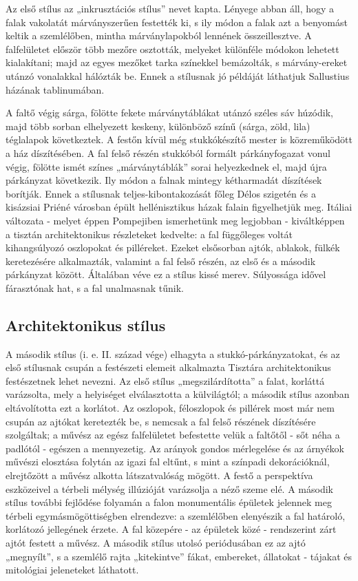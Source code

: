 	Az első stílus az „inkrusztációs stílus” nevet kapta. Lényege abban áll, hogy a falak
	vakolatát márványszerűen festették ki, s ily módon a falak azt a benyomást keltik a
	szemlélőben, mintha márványlapokból lennének összeillesztve. A falfelületet először
	több mezőre osztották, melyeket különféle módokon lehetett kialakítani; majd az egyes
	mezőket tarka színekkel bemázolták, s márvány-ereket utánzó vonalakkal hálózták be.
	Ennek a stílusnak jó példáját láthatjuk Sallustius házának tablinumában.
	
	
	A faltő végig sárga, fölötte fekete márványtáblákat utánzó széles sáv húzódik, majd több
	sorban elhelyezett keskeny, különböző színű (sárga, zöld, lila) téglalapok következtek. A
	festőn kívül még stukkókészítő mester is közreműködött a ház díszítésében. A fal felső
	részén stukkóból formált párkányfogazat vonul végig, fölötte ismét színes „márványtáblák” sorai helyezkednek el, majd újra párkányzat következik. Ily módon a
	falnak mintegy kétharmadát díszítések borítják.
	Ennek a stílusnak teljes-kibontakozását főleg Délos szigetén és a kisázsiai Priéné
	városban épült hellénisztikus házak falain figyelhetjük meg. Itáliai változata - melyet
	éppen Pompejiben ismerhetünk meg legjobban - kiváltképpen a tisztán architektonikus
	részleteket kedvelte: a fal függőleges voltát kihangsúlyozó oszlopokat és pilléreket.
	Ezeket elsősorban ajtók, ablakok, fülkék keretezésére alkalmazták, valamint a fal felső
	részén, az első és a második párkányzat között. Általában véve ez a stílus kissé merev.
	Súlyossága idővel fárasztónak hat, s a fal unalmasnak tűnik.
	
	\subsection{Architektonikus stílus}
	
	A második stílus (i. e. II. század vége) elhagyta a stukkó-párkányzatokat, és az első
	stílusnak csupán a festészeti elemeit alkalmazta Tisztára architektonikus festészetnek
	lehet nevezni. Az első stílus „megszilárdította” a falat, korláttá varázsolta, mely a
	helyiséget elválasztotta a külvilágtól; a második stílus azonban eltávolította ezt a korlátot.
	Az oszlopok, féloszlopok és pillérek most már nem csupán az ajtókat keretezték be, s
	nemcsak a fal felső részének díszítésére szolgáltak; a művész az egész falfelületet
	befestette velük a faltőtől - sőt néha a padlótól - egészen a mennyezetig.
	Az arányok gondos mérlegelése és az árnyékok művészi elosztása folytán az igazi fal
	eltűnt, s mint a színpadi dekorációknál, elrejtőzött a művész alkotta látszatvalóság
	mögött. A festő a perspektíva eszközeivel a térbeli mélység illúzióját varázsolja a néző
	szeme elé. A második stílus további fejlődése folyamán a falon monumentális épületek
	jelennek meg térbeli egymásmögöttiségben elrendezve: a szemlélőben elenyészik a fal
	határoló, korlátozó jellegének érzete. A fal közepére - az épületek közé - rendszerint zárt
	ajtót festett a művész. A második stílus utolsó periódusában ez az ajtó „megnyílt”, s a
	szemlélő rajta „kitekintve” fákat, embereket, állatokat - tájakat és mitológiai jeleneteket
	láthatott.
	
